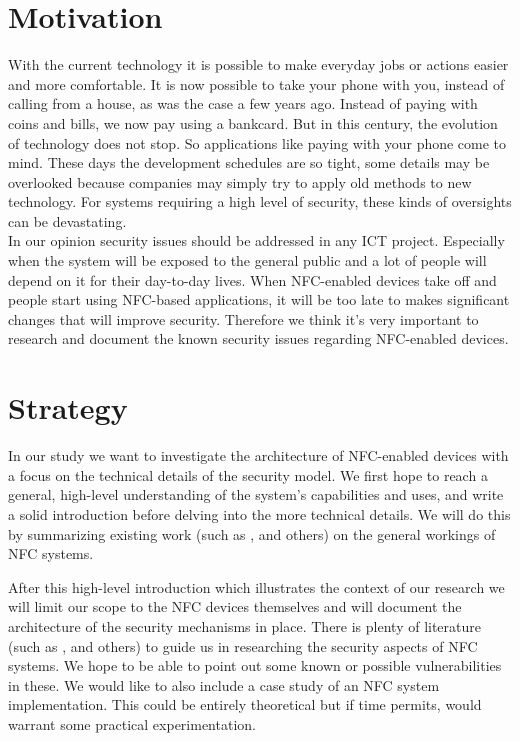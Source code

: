 \documentclass[11pt]{article} %
\begin{document}
\newpage
\section{Motivation}

With the current technology it is possible to make everyday jobs or actions easier and more comfortable.
It is now possible to take your phone with you, instead of calling from a house, as was the case a few years ago.
Instead of paying with coins and bills, we now pay using a bankcard.
But in this century, the evolution of technology does not stop. So applications like paying with your phone come to mind.
These days the development schedules are so tight, some details may be overlooked because companies may simply try to apply old methods to new technology.
For systems requiring a high level of security, these kinds of oversights can be devastating.
\\

\noindent In our opinion security issues should be addressed in any ICT project.
Especially when the system will be exposed to the general public and a lot of people will depend on it for their day-to-day lives.
When NFC-enabled devices take off and people start using NFC-based applications, it will be too late to makes significant changes that will improve security.
Therefore we think it's very important to research and document the known security issues regarding NFC-enabled devices.

\section{Strategy}
In our study we want to investigate the architecture of NFC-enabled devices with a focus on the technical details of the security model.
We first hope to reach a general, high-level understanding of the system's capabilities and uses, and write a solid introduction before delving into the more technical details.
We will do this by summarizing existing work (such as \cite{Paus2007}, \cite{1731794} and others) on the general workings of NFC systems.

After this high-level introduction which illustrates the context of our research we will limit our scope to the NFC devices themselves and will document the architecture of the security mechanisms in place.
There is plenty of literature (such as \cite{mulliner09:vulnanamms}, \cite{Kfir05pickingvirtual} and others) to guide us in researching the security aspects of NFC systems. 
We hope to be able to point out some known or possible vulnerabilities in these.
We would like to also include a case study of an NFC system implementation.
This could be entirely theoretical but if time permits, would warrant some practical experimentation.
\end{document}
